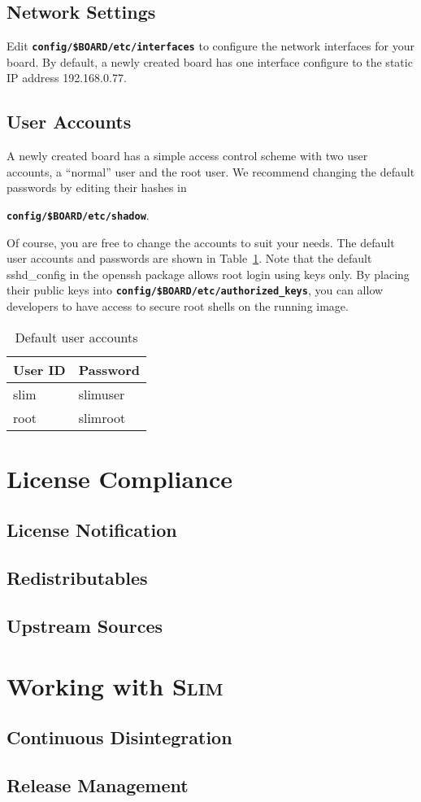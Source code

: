\documentclass[a4paper,10pt]{article}
\newenvironment{MyTable}{
 \bigskip
 \begin{table}[!hbp]\begin{center}
} {
 \end{center}\end{table}
}
\newcommand{\slim}{\textsc{Slim}\xspace}
\newcommand{\fw}{\tt\bf}
\begin{document}
\subsection{Network Settings}

   Edit {\fw config/\$BOARD/etc/interfaces} to configure the network
   interfaces for your board. By default, a newly created board has
   one interface configure to the static IP address 192.168.0.77.

\subsection{User Accounts}

   A newly created board has a simple access control scheme with two
   user accounts, a ``normal'' user and the root user.  We recommend
   changing the default passwords by editing their hashes in

   {\fw config/\$BOARD/etc/shadow}.

   Of course, you are free to change the accounts to suit your needs.
   The default user accounts and passwords are shown in
   Table~\ref{Passwords}.
%
   Note that the default sshd\_config in the openssh package allows
   root login using keys only. By placing their public keys into
   {\fw config/\$BOARD/etc/authorized\_keys}, you can allow developers
   to have access to secure root shells on the running image.

   \begin{MyTable}
     \begin{tabular}{|l|l|} \hline
     User ID	& Password \\ \hline
     slim	& slimuser \\ \hline
     root	& slimroot \\ \hline
     \end{tabular}
     \caption{Default user accounts}\label{Passwords}
   \end{MyTable}

\section{License Compliance}
\subsection{License Notification}
\subsection{Redistributables}
\subsection{Upstream Sources}

\section{Working with \slim}
\subsection{Continuous Disintegration}
\subsection{Release Management}



\end{document}
